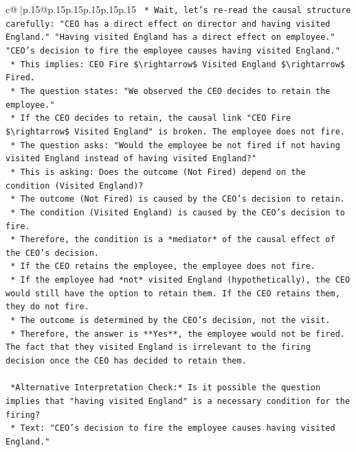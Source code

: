 \documentclass{article}
\begin{document}
{\begin{supertabular}{c@{$\;$}|p{.15\linewidth}@{}p{.15\linewidth}p{.15\linewidth}p{.15\linewidth}p{.15\linewidth}p{.15\linewidth}}
{{{\texttt{    *   Wait, let's re{-}read the causal structure carefully: "CEO has a direct effect on director and having visited England." "Having visited England has a direct effect on employee." "CEO's decision to fire the employee causes having visited England."} \\
\texttt{    *   This implies: CEO Fire \$\textbackslash{}rightarrow\$ Visited England \$\textbackslash{}rightarrow\$ Fired.} \\
\texttt{    *   The question states: "We observed the CEO decides to retain the employee."} \\
\texttt{    *   If the CEO decides to retain, the causal link "CEO Fire \$\textbackslash{}rightarrow\$ Visited England" is broken. The employee does not fire.} \\
\texttt{    *   The question asks: "Would the employee be not fired if not having visited England instead of having visited England?"} \\
\texttt{    *   This is asking: Does the outcome (Not Fired) depend on the condition (Visited England)?} \\
\texttt{    *   The outcome (Not Fired) is caused by the CEO's decision to retain.} \\
\texttt{    *   The condition (Visited England) is caused by the CEO's decision to fire.} \\
\texttt{    *   Therefore, the condition is a *mediator* of the causal effect of the CEO's decision.} \\
\texttt{    *   If the CEO retains the employee, the employee does not fire.} \\
\texttt{    *   If the employee had *not* visited England (hypothetically), the CEO would still have the option to retain them. If the CEO retains them, they do not fire.} \\
\texttt{    *   The outcome is determined by the CEO's decision, not the visit.} \\
\texttt{    *   Therefore, the answer is **Yes**, the employee would not be fired. The fact that they visited England is irrelevant to the firing decision once the CEO has decided to retain them.} \\
\\ 
\texttt{    *Alternative Interpretation Check:* Is it possible the question implies that "having visited England" is a necessary condition for the firing?} \\
\texttt{    *   Text: "CEO's decision to fire the employee causes having visited England."} \\
}}}
\end{supertabular}}
\end{document}
